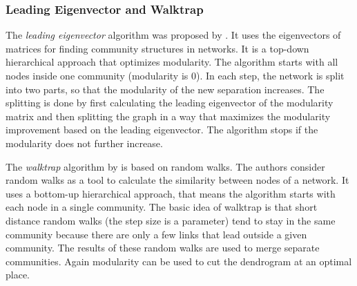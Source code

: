 \subsubsection{Leading Eigenvector and Walktrap}
The \emph{leading eigenvector} algorithm was proposed by \textcite{newman2006finding}.
It uses the eigenvectors of matrices for finding community structures in networks.
It is a top-down hierarchical approach that optimizes modularity.
The algorithm starts with all nodes inside one community (modularity is 0).
In each step, the network is split into two parts, so that the modularity of the new separation increases.
The splitting is done by first calculating the leading eigenvector of the modularity matrix and then splitting the graph in a way that maximizes the modularity improvement based on the leading eigenvector.
The algorithm stops if the modularity does not further increase.

The \emph{walktrap} algorithm by \textcite{pons2005computing} is based on random walks.
The authors consider random walks as a tool to calculate the similarity between nodes of a network.
It uses a bottom-up hierarchical approach, that means the algorithm starts with each node in a single community.
The basic idea of walktrap is that short distance random walks (the step size is a parameter) tend to stay in the same community because there are only a few links that lead outside a given community.
The results of these random walks are used to merge separate communities.
Again modularity can be used to cut the dendrogram at an optimal place.